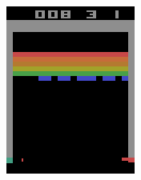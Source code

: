 \begin{figure}
\begin{subfigure}[h]{0.19\linewidth}
\includegraphics[width=\linewidth]{images/frame-sequence-3.png}
\end{subfigure}
\hfill
\begin{subfigure}[h]{0.19\linewidth}

\end{subfigure}
\end{figure}
